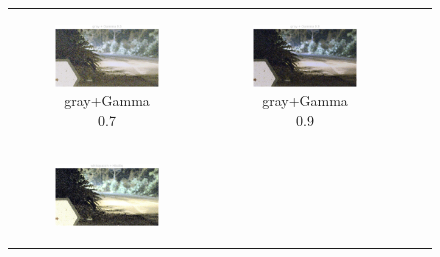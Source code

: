 \documentclass[11pt, a4]{article}
\begin{document}
\begin{enumerate}
\begin{figure}[H]
{\begin{tabular}{cccc}
						\begin{subfigure}[h]{0.45\linewidth}
							\centering
							\includegraphics[width=\linewidth]{../output/RawImage3_Tone_gray_Gamma0.5.pdf}
							\caption{gray+Gamma 0.7}
							\label{fig:RawImage3_tone_3}
						\end{subfigure} &
						\begin{subfigure}[h]{0.45\linewidth}
							\centering
							\includegraphics[width=\linewidth]{../output/RawImage3_Tone_gray_Gamma0.9.pdf}
							\caption{gray+Gamma 0.9}
							\label{fig:RawImage3_tone_4}
						\end{subfigure}\\
						\begin{subfigure}[h]{0.45\linewidth}
							\centering
							\includegraphics[width=\linewidth]{../output/RawImage3_Tone_whitepatch_HistEq.pdf}

\end{subfigure}
\end{tabular}}
\end{figure}
\end{enumerate}
\end{document}
